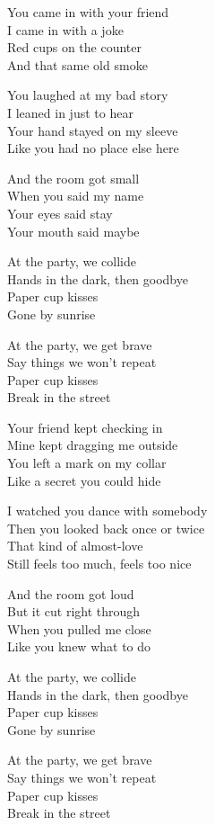 \begin{lyrics}
You came in with your friend\\
I came in with a joke\\
Red cups on the counter\\
And that same old smoke

You laughed at my bad story\\
I leaned in just to hear\\
Your hand stayed on my sleeve\\
Like you had no place else here

And the room got small\\
When you said my name\\
Your eyes said stay\\
Your mouth said maybe

At the party, we collide\\
Hands in the dark, then goodbye\\
Paper cup kisses\\
Gone by sunrise

At the party, we get brave\\
Say things we won’t repeat\\
Paper cup kisses\\
Break in the street

Your friend kept checking in\\
Mine kept dragging me outside\\
You left a mark on my collar\\
Like a secret you could hide

I watched you dance with somebody\\
Then you looked back once or twice\\
That kind of almost-love\\
Still feels too much, feels too nice

And the room got loud\\
But it cut right through\\
When you pulled me close\\
Like you knew what to do

At the party, we collide\\
Hands in the dark, then goodbye\\
Paper cup kisses\\
Gone by sunrise

At the party, we get brave\\
Say things we won’t repeat\\
Paper cup kisses\\
Break in the street


\end{lyrics}
